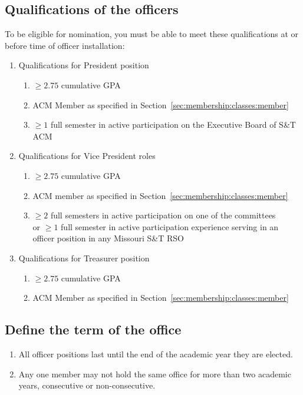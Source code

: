 \subsection{Qualifications of the officers}
To be eligible for nomination, you must be able to meet these qualifications at or before
time of officer installation:
\begin{enumerate}[label=\arabic*.]
  \item Qualifications for President position
    \begin{enumerate}[label=\arabic*.]
      \item $\geq{2.75}$ cumulative GPA
      \item ACM Member as specified in
        Section~\ref{sec:membership:classes:member}
      \item $\geq{1}$ full semester in active participation on the Executive
        Board of S\&T ACM
    \end{enumerate}
  \item Qualifications for Vice President roles
    \begin{enumerate}[label=\arabic*.]
      \item $\geq{2.75}$ cumulative GPA
      \item ACM member as specified in
        Section~\ref{sec:membership:classes:member}
      \item $\geq{2}$ full semesters in active participation on one of the
        committees\\ or $\geq{1}$ full semester in active participation
        experience serving in an officer position in any Missouri S\&T RSO
    \end{enumerate}
  \item Qualifications for Treasurer position
    \begin{enumerate}[label=\arabic*.]
      \item $\geq{2.75}$ cumulative GPA
      \item ACM Member as specified in
        Section~\ref{sec:membership:classes:member}
    \end{enumerate}
\end{enumerate}

\subsection{Define the term of the office}
\begin{enumerate}[label=\arabic*.]
  \item All officer positions last until the end of the academic year they are
    elected.
  \item Any one member may not hold the same office for more than two academic
    years, consecutive or non-consecutive.
\end{enumerate}

